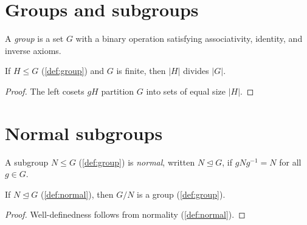 \documentclass{article}
\begin{document}
\section{Groups and subgroups}

\begin{definition}\label{def:group}
  A \emph{group} is a set $G$ with a binary operation satisfying
  associativity, identity, and inverse axioms.
\end{definition}

\begin{theorem}\label{thm:lagrange}
  If $H \le G$ (\cref{def:group}) and $G$ is finite, then $|H|$ divides $|G|$.
\end{theorem}

\begin{proof}
  The left cosets $gH$ partition $G$ into sets of equal size $|H|$.
\end{proof}

\section{Normal subgroups}

\begin{definition}\label{def:normal}
  A subgroup $N \le G$ (\cref{def:group}) is \emph{normal}, written
  $N \trianglelefteq G$, if $gNg^{-1} = N$ for all $g \in G$.
\end{definition}

\begin{theorem}\label{thm:quotient}
  If $N \trianglelefteq G$ (\cref{def:normal}), then $G/N$ is a group
  (\cref{def:group}).
\end{theorem}

\begin{proof}
  Well-definedness follows from normality (\cref{def:normal}).
\end{proof}
\end{document}
